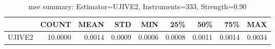 \begin{table}[ht]
\centering
\caption{mse summary: Estimator=UJIVE2, Instruments=333, Strength=0.90}
\begin{tabular}{lrrrrrrrr}
\toprule
 & COUNT & MEAN & STD & MIN & 25\% & 50\% & 75\% & MAX \\
\midrule
UJIVE2 & 10.0000 & 0.0014 & 0.0009 & 0.0006 & 0.0008 & 0.0011 & 0.0014 & 0.0034 \\
\bottomrule
\end{tabular}
\end{table}
